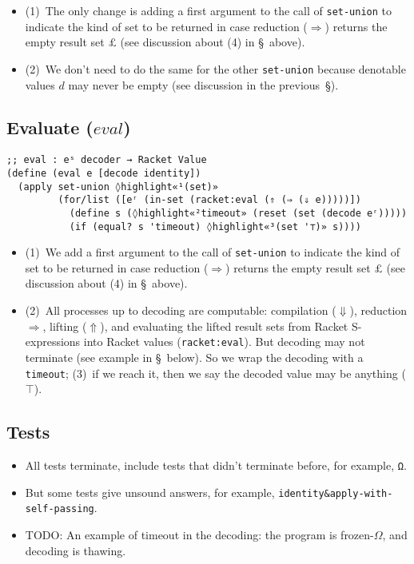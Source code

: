 \documentclass[12pt, oneside]{book}
\begin{document}
\begin{itemize}
  \item (1)~The only change is adding a first argument to the call of \texttt{set-union} to indicate the kind of set to be returned in case reduction (\(⇒\)) returns the empty result set \(£\) (see discussion about (4) in §~above).
  \item (2)~We don’t need to do the same for the other \texttt{set-union} because denotable values \(d\) may never be empty (see discussion in the previous~§).
\end{itemize}

\subsection{Evaluate (\(eval\))}

\begin{Verbatim}
;; eval : eˢ decoder → Racket Value
(define (eval e [decode identity])
  (apply set-union ◊highlight«¹(set)»
         (for/list ([eʳ (in-set (racket:eval (⇑ (⇒ (⇓ e)))))])
           (define s (◊highlight«²timeout» (reset (set (decode eʳ)))))
           (if (equal? s 'timeout) ◊highlight«³(set '⊤)» s))))
\end{Verbatim}

\begin{itemize}
  \item (1)~We add a first argument to the call of \texttt{set-union} to indicate the kind of set to be returned in case reduction (\(⇒\)) returns the empty result set \(£\) (see discussion about (4) in §~above).
  \item (2)~All processes up to decoding are computable: compilation (\(⇓\)), reduction \(⇒\), lifting (\(⇑\)), and evaluating the lifted result sets from Racket S-expressions into Racket values (\texttt{racket:eval}). But decoding may not terminate (see example in §~below). So we wrap the decoding with a \texttt{timeout}; (3)~if we reach it, then we say the decoded value may be anything (\(⊤\)).
\end{itemize}

\subsection{Tests}

\begin{itemize}
  \item All tests terminate, include tests that didn’t terminate before, for example, \texttt{Ω}.
  \item But some tests give unsound answers, for example, \texttt{identity\&apply-with-self-passing}.
  \item TODO: An example of timeout in the decoding: the program is frozen-\(Ω\), and decoding is thawing.
\end{itemize}
\end{document}
